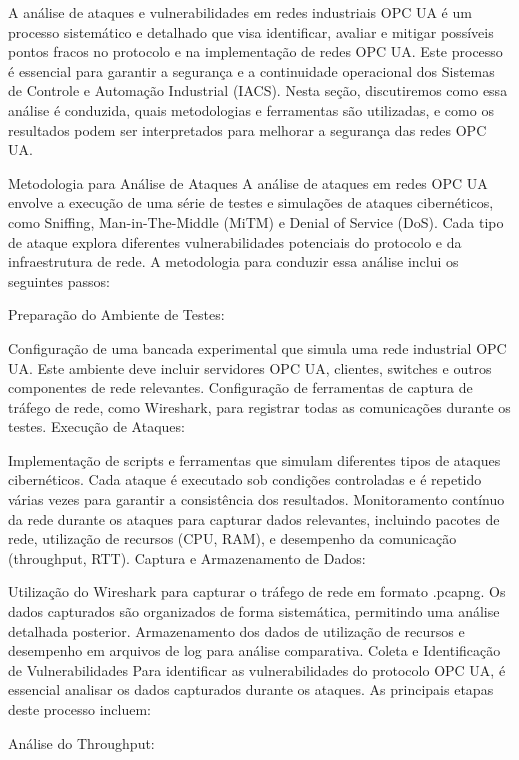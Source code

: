     {\color{red}
    A análise de ataques e vulnerabilidades em redes industriais OPC UA é um processo sistemático e detalhado que visa identificar, avaliar e mitigar possíveis pontos fracos no protocolo e na implementação de redes OPC UA. Este processo é essencial para garantir a segurança e a continuidade operacional dos Sistemas de Controle e Automação Industrial (IACS). Nesta seção, discutiremos como essa análise é conduzida, quais metodologias e ferramentas são utilizadas, e como os resultados podem ser interpretados para melhorar a segurança das redes OPC UA.

    Metodologia para Análise de Ataques
    A análise de ataques em redes OPC UA envolve a execução de uma série de testes e simulações de ataques cibernéticos, como Sniffing, Man-in-The-Middle (MiTM) e Denial of Service (DoS). Cada tipo de ataque explora diferentes vulnerabilidades potenciais do protocolo e da infraestrutura de rede. A metodologia para conduzir essa análise inclui os seguintes passos:

    Preparação do Ambiente de Testes:

    Configuração de uma bancada experimental que simula uma rede industrial OPC UA. Este ambiente deve incluir servidores OPC UA, clientes, switches e outros componentes de rede relevantes.
    Configuração de ferramentas de captura de tráfego de rede, como Wireshark, para registrar todas as comunicações durante os testes.
    Execução de Ataques:

    Implementação de scripts e ferramentas que simulam diferentes tipos de ataques cibernéticos. Cada ataque é executado sob condições controladas e é repetido várias vezes para garantir a consistência dos resultados.
    Monitoramento contínuo da rede durante os ataques para capturar dados relevantes, incluindo pacotes de rede, utilização de recursos (CPU, RAM), e desempenho da comunicação (throughput, RTT).
    Captura e Armazenamento de Dados:

    Utilização do Wireshark para capturar o tráfego de rede em formato .pcapng. Os dados capturados são organizados de forma sistemática, permitindo uma análise detalhada posterior.
    Armazenamento dos dados de utilização de recursos e desempenho em arquivos de log para análise comparativa.
    Coleta e Identificação de Vulnerabilidades
    Para identificar as vulnerabilidades do protocolo OPC UA, é essencial analisar os dados capturados durante os ataques. As principais etapas deste processo incluem:

    Análise do Throughput:

}
